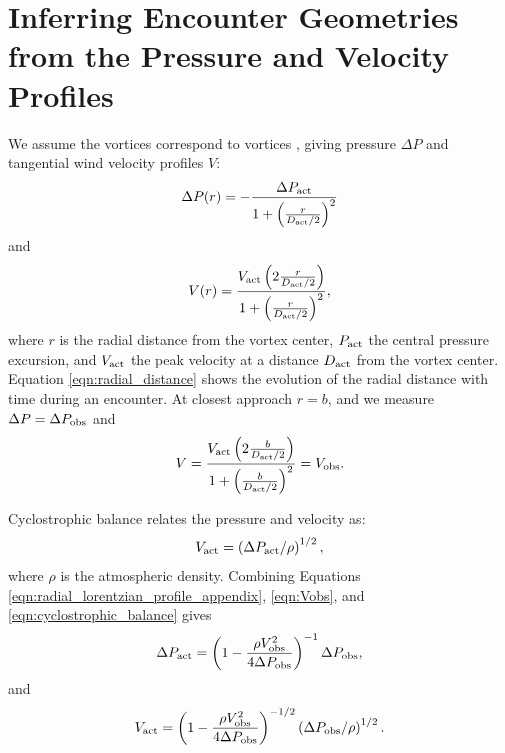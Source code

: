 \documentclass[linenumbers,trackchanges]{aastex63}
\begin{document}
\section{Inferring Encounter Geometries from the Pressure and Velocity Profiles}
\label{sec:Inferring Encounter Geometries from the Pressure and Velocity Profiles}
We assume the vortices correspond to  vortices \citep{1991ExFl...11...73V}, giving pressure $\Delta P$ and tangential wind velocity profiles $V$:
\begin{equation}
    \Delta P(r) = -\frac{\Delta P_{\rm act}}{1 + \left( \frac{r}{D_{\rm act}/2} \right)^2}\label{eqn:radial_lorentzian_profile_appendix}
\end{equation}
and
\begin{equation}
    V(r) = \frac{ V_{\rm act} \left( 2 \frac{r}{D_{\rm act}/2} \right)}{1 + \left( \frac{r}{D_{\rm act}/2} \right)^2},\label{eqn:radial_wind_profile}
\end{equation}
where $r$ is the radial distance from the vortex center, $P_{\rm act}$ the central pressure excursion, and $V_{\rm act}$ the peak velocity at a distance $D_{\rm act}$ from the vortex center. Equation \ref{eqn:radial_distance} shows the evolution of the radial distance with time during an encounter. At closest approach $r = b$, and we measure $\Delta P = \Delta P_{\rm obs}$ and 
\begin{equation}
    V = \frac{ V_{\rm act} \left( 2\frac{b}{D_{\rm act}/2} \right)}{1 + \left( \frac{b}{D_{\rm act}/2} \right)^2} = V_{\rm obs}.\label{eqn:Vobs}
\end{equation} 

Cyclostrophic balance relates the pressure and velocity \citep{2020Icar..33813523J} as:
\begin{equation}
    V_{\rm act} = \left( \Delta P_{\rm act}/\rho \right)^{1/2},\label{eqn:cyclostrophic_balance}
\end{equation}
where $\rho$ is the atmospheric density. Combining Equations \ref{eqn:radial_lorentzian_profile_appendix}, \ref{eqn:Vobs}, and \ref{eqn:cyclostrophic_balance} gives
\begin{equation}
    \Delta P_{\rm act} = \left( 1 - \frac{\rho V_{\rm obs}^2}{4 \Delta P_{\rm obs}} \right)^{-1} \Delta P_{\rm obs},\label{eqn:solution_for_Pact}
\end{equation}
and
\begin{equation}
    V_{\rm act} = \left( 1 - \frac{\rho V_{\rm obs}^2}{4 \Delta P_{\rm obs}} \right)^{-1/2} \left( \Delta P_{\rm obs}/\rho \right)^{1/2}.\label{eqn:solution_for_Vact}
\end{equation}
\end{document}
